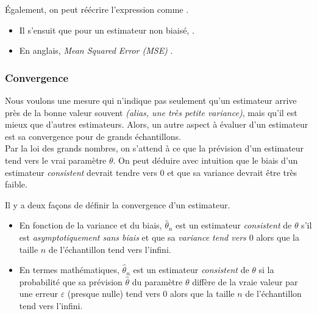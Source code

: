 \documentclass[10pt, french]{article}
\begin{document}
\begin{multicols*}{2}
\begin{definitionNOHFILL}
Également, on peut réécrire l'expression comme .

\bigskip

\begin{itemize}
	\item	Il s'ensuit que pour un estimateur non biaisé, .
	\item	En anglais, \og \textit{Mean Squared Error (MSE)} \fg{}.
\end{itemize}
\end{definitionNOHFILL}



\columnbreak
\subsubsection{Convergence}\label{subsubsec:ConsistencyEstim}
\begin{rappel_enhanced}[Motivation]
Nous voulons une mesure qui n'indique pas seulement qu'un estimateur arrive près de la bonne valeur souvent \textit{(alias, une très petite variance)}, mais qu'il est mieux que d'autres estimateurs. Alors, un autre aspect à évaluer d'un estimateur est sa convergence pour de grands échantillons. \\

Par la loi des grands nombres, on s'attend à ce que la prévision d'un estimateur tend vers le vrai paramètre $\theta$. On peut déduire avec intuition que le biais d'un estimateur \og \textit{consistent} \fg{} devrait tendre vers $0$ et que sa variance devrait être très faible.
\end{rappel_enhanced}

Il y a deux façons de définir la convergence d'un estimateur. 
\begin{itemize}
	\item	En fonction de la variance et du biais, $\hat{\theta}_{n}$ est un estimateur \og \textit{consistent} \fg{} de $\theta$ s'il est \textit{asymptotiquement sans biais} et que sa \textit{variance tend vers $0$} alors que la taille $n$ de l'échantillon tend vers l'infini.
	\item	En termes mathématiques, $\hat{\theta}_{n}$ est un estimateur \og \textit{consistent} \fg{} de $\theta$ si la probabilité que sa prévision $\hat{\theta}$ du paramètre $\theta$ diffère de la vraie valeur par une erreur $\varepsilon$ (presque nulle) tend vers $0$ alors que la taille $n$ de l'échantillon tend vers l'infini.
\end{itemize}


\end{multicols*}
\end{document}
